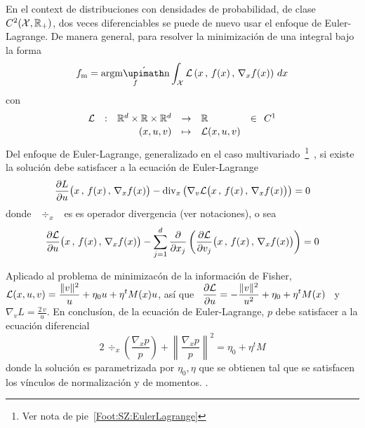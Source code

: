 En  el  context de  distribuciones  con  densidades  de probabilidad,  de  clase
$C^2(\mathcal{X},\mathbb{R}_+)$, dos veces diferenciables se puede de nuevo usar el enfoque de
Euler-Lagrange.  De  manera general,  para  resolver  la minimizaci\'on  de  una
integral bajo la forma
%
\[
f_{\mathrm{m}}  = \argmin_f  \int_\X \L\left(  x \,  , \,  f(x) \,  , \, \nabla_x
f(x) \right) \, dx
\]
%
con
%
\[
\begin{array}{rcrlll}
\L & : & \Rset^d  \times  \Rset  \times  \Rset^d & \to & \Rset &  \in \:\:  C^1\\[.5mm]
%
& & (x,u,v) & \mapsto & \L(x,u,v) &
\end{array}
\]
%
Del     enfoque    de     Euler-Lagrange,     generalizado     en    el     caso
multivariado~\footnote{Ver                        nota                        de
pie~\ref{Foot:SZ:EulerLagrange}}~\cite{GelFom63, Wei74, Bru04,  Cla13, Kom1}, si
existe la soluci\'on debe satisfacer a la ecuaci\'on de Euler-Lagrange
%
\[
\frac{\partial  L}{\partial  u}\big(  x  \,  , \,  f(x)  \,  ,  \,  \nabla_x
 f(x) \big) - \operatorname{div}_x  \left( \nabla_v \mathcal{L} \big( x \, , \,  f(x) \, , \, \nabla_x
 f(x) \big) \right) = 0
\]
%
donde \ $\div_x$ \ es es operador divergencia (ver notaciones), o sea
%
\[
\frac{\partial  \mathcal{L}}{\partial  u}\big( x  \,  ,  \,  f(x)  \, ,  \,  \nabla_x
f(x)        \big)         -        \sum_{j=1}^d        \frac{\partial}{\partial
x_j}  \left(  \frac{\partial  \mathcal{L}}{\partial  v_j}  \big(  x  \,  ,  \,  f(x)  \,
,  \,  \nabla_x  f(x)  \big)  \right)   =  0
\]

Aplicado  al   problema  de  minimizac\'on   de  la  informaci\'on   de  Fisher,
$\displaystyle \mathcal{L}(x,u,v) = \frac{\| v \|^2}{u} + \eta_0 u + \eta^t M(x) u$, as\'i
que \  $\displaystyle \frac{\partial \mathcal{L}}{\partial  u} = - \frac{\|  v \|^2}{u^2}
+ \eta_0 + \eta^t M(x)$ \ y \ $ \nabla_v L = \frac{2 \, v}{u}$. En conclus\'ion,
de  la  ecuaci\'on  de  Euler-Lagrange,  $p$ debe  satisfacer  a  la  ecuaci\'on
diferencial
%
\[
2  \,  \div_x  \left(  \frac{\nabla_x p}{p}  \right)  +  \left\| \frac{ \nabla_x
p}{p} \right\|^2 = \eta_0 + \eta^t M
\]
%
donde la soluci\'on es parametrizada por  $\eta_0, \eta$ que se obtienen tal que
se satisfacen los  v\'inculos de normalizaci\'on y de  momentos.
%
.

